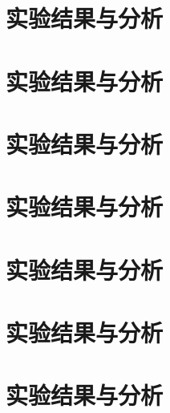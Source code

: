 \documentclass{USTBBook}
\begin{document}
\chapter{实验结果与分析}
\zhlipsum[14]

\chapter{实验结果与分析}
\zhlipsum[14]

\chapter{实验结果与分析}
\zhlipsum[14]

\chapter{实验结果与分析}
\zhlipsum[14]

\chapter{实验结果与分析}
\zhlipsum[14]

\chapter{实验结果与分析}
\zhlipsum[14]

\chapter{实验结果与分析}
\zhlipsum[14]

\backmatter
\end{document}
